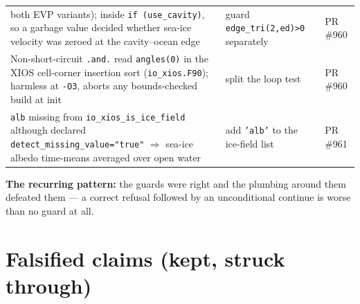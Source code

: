 \documentclass[11pt,a4paper]{article}
\newcommand{\code}[1]{\texttt{\small #1}}
\begin{document}
\begin{longtable}{@{}p{6.2cm}p{6.6cm}p{2.2cm}@{}}
  both EVP variants); inside \code{if (use\_cavity)}, so a garbage value decided whether sea-ice
  velocity was zeroed at the cavity--ocean edge & guard \code{edge\_tri(2,ed)>0} separately &
  PR\,\#960 \\
Non-short-circuit \code{.and.} read \code{angles(0)} in the XIOS cell-corner insertion sort
  (\code{io\_xios.F90}); harmless at \code{-O3}, aborts any bounds-checked build at init & split the
  loop test & PR\,\#960 \\
\code{alb} missing from \code{io\_xios\_is\_ice\_field} although declared
  \code{detect\_missing\_value="true"} $\Rightarrow$ sea-ice albedo time-means averaged over open
  water & add \code{'alb'} to the ice-field list & PR\,\#961 \\
\bottomrule
\end{longtable}

\noindent
\textbf{The recurring pattern:} the guards were right and the plumbing around them defeated them ---
a correct refusal followed by an unconditional continue is worse than no guard at all.

\section{Falsified claims (kept, struck through)}\label{sec:falsified}
\end{document}
